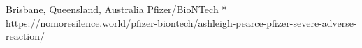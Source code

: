           {Brisbane, Queensland, Australia}
          {}
          {Pfizer/BioNTech}
          {*}
          {
          }
          {https://nomoresilence.world/pfizer-biontech/ashleigh-pearce-pfizer-severe-adverse-reaction/}

